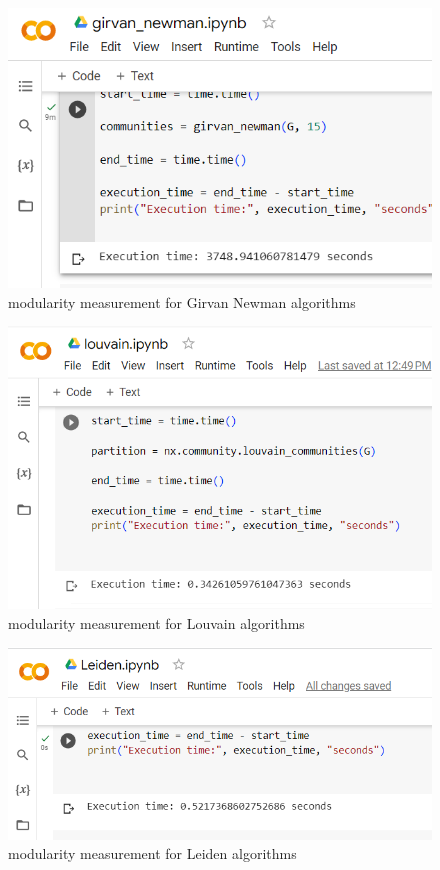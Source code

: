 \begin{figure}[H]
    \centering
    \includegraphics[width=\textwidth]{image/girvantimetest.png}
    \caption{modularity measurement for Girvan Newman algorithms}
\end{figure}

\begin{figure}[H]
    \centering
    \includegraphics[width=\textwidth]{image/louvaintimetest.png}
    \caption{modularity measurement for Louvain algorithms}
\end{figure}

\begin{figure}[H]
    \centering
    \includegraphics[width=\textwidth]{image/leidentimetest.png}
    \caption{modularity measurement for Leiden algorithms}
\end{figure}

